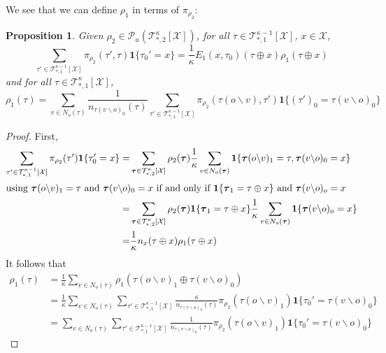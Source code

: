 \documentclass[12pt]{article}
\newtheorem{proposition}[theorem]{Proposition}
\newcommand{\one}[1]{\mathbf{1}\{#1\}}
\newcommand{\tree}[2]{\mathcal{T}_{*, #1}^{#2}[\mathcal{X}]}
\newcommand{\TB}{{ \boldsymbol\tau}}
\numberwithin{equation}{section}
\begin{document}
We see that we can define $\rho_1$ in terms of $\pi_{\rho_2}$:
\begin{proposition}
    Given $\rho_2\in \mathcal{P}_u(\mathcal{T}_{*, 2}^\kappa[\mathcal{X}])$, for all $\tau\in \mathcal{T}_{*, 1}^{\kappa-1}[\mathcal{X}]$, $x\in \mathcal{X}$,
    \begin{equation}\label{Eq.NNNI-rho1-in-pi-rho2}
        \sum_{\tau'\in\tree{1}{\kappa-1}}\pi_{\rho_2}(\tau',\tau)\one{\tau_0'=x} = \frac1\kappa E_1(x, \tau_0)(\tau\oplus x) \rho_1(\tau\oplus x)
    \end{equation}
    and for all $\tau\in \mathcal{T}_{*, 1}^{\kappa}[\mathcal{X}]$,
    \begin{equation}\label{Eq.NNNI-rho1-in-pi-rho2-2}
        \rho_1(\tau) = \sum_{v\in N_o(\tau)}\frac1{n_{\tau(v\backslash o)_0}(\tau)}\sum_{\tau'\in\tree{1}{\kappa-1}}\pi_{\rho_2}(\tau(o\backslash v), \tau')\one{(\tau')_0=\tau(v\backslash o)_0}
    \end{equation}
\end{proposition}

\begin{proof}
    First,
    \begin{align*}
        \sum_{\tau'\in\tree{1}{\kappa-1}}\pi_{\rho_2}(\tau')\one{\tau_0'=x}
        = & \sum_{\TB\in\tree{2}{\kappa}}\rho_2(\TB)\frac1\kappa \sum_{v\in N_o(\TB)}\one{\TB(o\backslash v)_1 = \tau, \TB(v\backslash o)_0=x} \\
        \intertext{using $\TB(o\backslash v)_1 = \tau$ and $\TB(v\backslash o)_0=x$ if and only if $\one{\TB_1 = \tau\oplus x}
            $ and $\TB(v\backslash o)_o=x$}
        = & \sum_{\TB\in\tree{2}{\kappa}}\rho_2(\TB)\one{\TB_1 = \tau\oplus x} \frac1\kappa \sum_{v\in N_o(\TB)}\one{\TB(v\backslash o)_o=x}   \\
        = & \frac1\kappa n_x(\tau\oplus x)\rho_1(\tau\oplus x)
    \end{align*}
    It follows that
    \begin{align*}
        \rho_1(\tau) & = \frac1\kappa\sum_{v\in N_o(\tau)}\rho_1(\tau(o\backslash v)_1\oplus \tau(v\backslash o)_0)                                                                                               \\
                     & = \frac1\kappa\sum_{v\in N_o(\tau)}\sum_{\tau'\in\tree{1}{\kappa-1}}\frac{\kappa}{ n_{\tau(v\backslash o)_0}(\tau)}\pi_{\rho_2}(\tau(o\backslash v)_1)\one{\tau_0'= \tau(v\backslash o)_0} \\
                     & = \sum_{v\in N_o(\tau)}\sum_{\tau'\in\tree{1}{\kappa-1}}\frac{1}{n_{\tau(v\backslash o)_0}(\tau)}\pi_{\rho_2}(\tau(o\backslash v)_1)\one{\tau_0'= \tau(v\backslash o)_0}
    \end{align*}
\end{proof}
\end{document}
